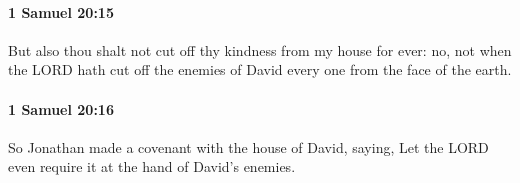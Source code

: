 		\paragraph{1 Samuel 20:15} %
			\label{1SAMUEL-20-15}

			But also thou shalt not cut off thy kindness from my house for ever: no, not when the LORD hath cut off the enemies of David every one from the face of the earth.


		\paragraph{1 Samuel 20:16} %
			\label{1SAMUEL-20-16}

			So Jonathan made a covenant with the house of David, saying, Let the LORD even require it at the hand of David’s enemies.


